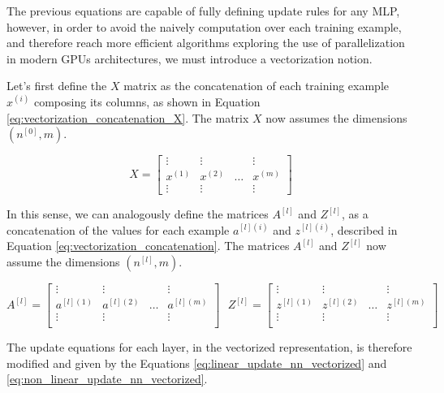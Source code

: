 The previous equations are capable of fully defining update rules for any MLP, however, in order to avoid the naively computation over each training example, and therefore reach more efficient algorithms exploring the use of parallelization in modern GPUs architectures, we must introduce a vectorization notion.

Let's first define the $X$ matrix as the concatenation of each training example $x^{(i)}$ composing its columns, as shown in Equation \eqref{eq:vectorization_concatenation_X}. The matrix $X$ now assumes the dimensions $(n^{[0]},m)$.

\begin{equation}
X = 
\begin{bmatrix}
\vdots & \vdots &  & \vdots \\
x^{(1)} & x^{(2)} & \dots & x^{(m)} \\
\vdots & \vdots &  & \vdots
\end{bmatrix}
\label{eq:vectorization_concatenation_X}
\end{equation}

In this sense, we can analogously define the matrices $A^{[l]}$ and $Z^{[l]}$, as a concatenation of the values for each example $a^{[l](i)}$ and $z^{[l](i)}$, described in Equation \eqref{eq:vectorization_concatenation}. The matrices $A^{[l]}$ and $Z^{[l]}$ now assume the dimensions $(n^{[l]},m)$.

\begin{equation}
A^{[l]} = 
\begin{bmatrix}
\vdots & \vdots &  & \vdots \\
a^{[l](1)} & a^{[l](2)} & \dots & a^{[l](m)} \\
\vdots & \vdots &  & \vdots \\
\end{bmatrix}
\text{ }
Z^{[l]} = 
\begin{bmatrix}
\vdots & \vdots &  & \vdots \\
z^{[l](1)} & z^{[l](2)} & \dots & z^{[l](m)} \\
\vdots & \vdots &  & \vdots \\
\end{bmatrix}
\label{eq:vectorization_concatenation}
\end{equation}

The update equations for each layer, in the vectorized representation, is therefore modified and given by the Equations \eqref{eq:linear_update_nn_vectorized} and \eqref{eq:non_linear_update_nn_vectorized}.

